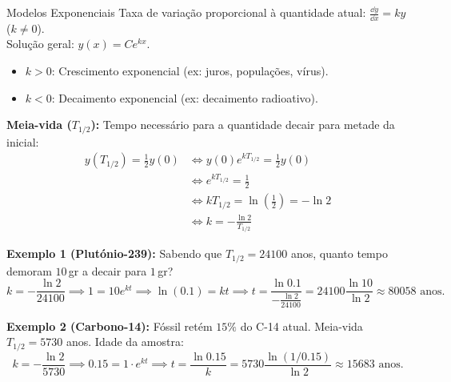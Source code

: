 \documentclass[11pt,a4paper]{article}
\begin{document}
\begin{theorembox}{Modelos Exponenciais}
  Taxa de variação proporcional à quantidade atual: $\frac{\dd y}{\dd x} = k y$ ($k \neq 0$). \\ Solução geral: $y(x) = C e^{kx}$.
  \begin{itemize}
    \item $k > 0$: Crescimento exponencial (ex: juros, populações, vírus).
    \item $k < 0$: Decaimento exponencial (ex: decaimento radioativo).
  \end{itemize}

  \vspace{1em}

  \textbf{Meia-vida ($T_{1/2}$):} Tempo necessário para a quantidade decair para metade da inicial:
    \begin{align*}
      y(T_{1/2}) = \frac{1}{2}y(0) &\iff y(0)e^{k T_{1/2}} = \frac{1}{2}y(0) \\
      &\iff e^{k T_{1/2}} = \frac{1}{2} \\
      &\iff k T_{1/2} = \ln\left(\frac{1}{2}\right) = -\ln 2 \\
      &\iff k = - \frac{\ln 2}{T_{1/2}}
    \end{align*}

  \textbf{Exemplo 1 (Plutónio-239):} Sabendo que $T_{1/2} = 24100$ anos, quanto tempo demoram $10$\,gr a decair para $1$\,gr?
  \[
    k = - \frac{\ln 2}{24100} \implies 1 = 10 e^{kt} \implies \ln(0.1) = kt \implies t = \frac{\ln 0.1}{-\frac{\ln 2}{24100}} = 24100 \frac{\ln 10}{\ln 2} \approx 80058 \text{ anos}.
  \]

  \vspace{1em}

  \textbf{Exemplo 2 (Carbono-14):} Fóssil retém $15\%$ do C-14 atual. Meia-vida $T_{1/2} = 5730$ anos. Idade da amostra:
  \[
    k = - \frac{\ln 2}{5730} \implies 0.15 = 1 \cdot e^{kt} \implies t = \frac{\ln 0.15}{k} = 5730 \frac{\ln(1/0.15)}{\ln 2} \approx 15683 \text{ anos}.
  \]
\end{theorembox}
\end{document}
